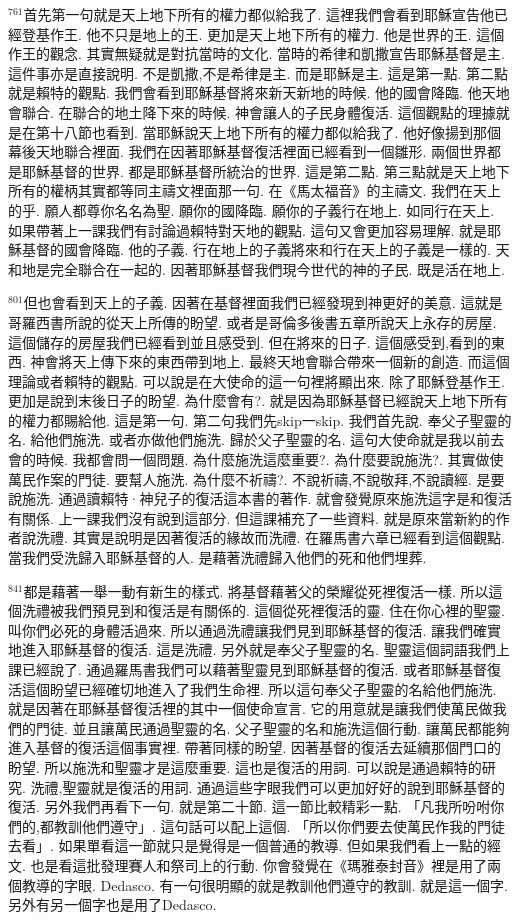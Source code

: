 \documentclass{book}
\begin{document}
$^{761}$首先第一句就是天上地下所有的權力都似給我了.
這裡我們會看到耶穌宣告他已經登基作王.
他不只是地上的王.
更加是天上地下所有的權力.
他是世界的王.
這個作王的觀念.
其實無疑就是對抗當時的文化.
當時的希律和凱撒宣告耶穌基督是主.
這件事亦是直接說明.
不是凱撒,不是希律是主.
而是耶穌是主.
這是第一點.
第二點就是賴特的觀點.
我們會看到耶穌基督將來新天新地的時候.
他的國會降臨.
他天地會聯合.
在聯合的地土降下來的時候.
神會讓人的子民身體復活.
這個觀點的理據就是在第十八節也看到.
當耶穌說天上地下所有的權力都似給我了.
他好像揚到那個幕後天地聯合裡面.
我們在因著耶穌基督復活裡面已經看到一個雛形.
兩個世界都是耶穌基督的世界.
都是耶穌基督所統治的世界.
這是第二點.
第三點就是天上地下所有的權柄其實都等同主禱文裡面那一句.
在《馬太福音》的主禱文.
我們在天上的乎.
願人都尊你名名為聖.
願你的國降臨.
願你的子義行在地上.
如同行在天上.
如果帶著上一課我們有討論過賴特對天地的觀點.
這句又會更加容易理解.
就是耶穌基督的國會降臨.
他的子義.
行在地上的子義將來和行在天上的子義是一樣的.
天和地是完全聯合在一起的.
因著耶穌基督我們現今世代的神的子民.
既是活在地上.

$^{801}$但也會看到天上的子義.
因著在基督裡面我們已經發現到神更好的美意.
這就是哥羅西書所說的從天上所傳的盼望.
或者是哥倫多後書五章所說天上永存的房屋.
這個儲存的房屋我們已經看到並且感受到.
但在將來的日子.
這個感受到,看到的東西.
神會將天上傳下來的東西帶到地上.
最終天地會聯合帶來一個新的創造.
而這個理論或者賴特的觀點.
可以說是在大使命的這一句裡將顯出來.
除了耶穌登基作王.
更加是說到末後日子的盼望.
為什麼會有?.
就是因為耶穌基督已經說天上地下所有的權力都賜給他.
這是第一句.
第二句我們先skip一skip.
我們首先說.
奉父子聖靈的名.
給他們施洗.
或者亦做他們施洗.
歸於父子聖靈的名.
這句大使命就是我以前去會的時候.
我都會問一個問題.
為什麼施洗這麼重要?.
為什麼要說施洗?.
其實做使萬民作案的門徒.
要幫人施洗.
為什麼不祈禱?.
不說祈禱,不說敬拜,不說讀經.
是要說施洗.
通過讀賴特·神兒子的復活這本書的著作.
就會發覺原來施洗這字是和復活有關係.
上一課我們沒有說到這部分.
但這課補充了一些資料.
就是原來當新約的作者說洗禮.
其實是說明是因著復活的緣故而洗禮.
在羅馬書六章已經看到這個觀點.
當我們受洗歸入耶穌基督的人.
是藉著洗禮歸入他們的死和他們埋葬.

$^{841}$都是藉著一舉一動有新生的樣式.
將基督藉著父的榮耀從死裡復活一樣.
所以這個洗禮被我們預見到和復活是有關係的.
這個從死裡復活的靈.
住在你心裡的聖靈.
叫你們必死的身體活過來.
所以通過洗禮讓我們見到耶穌基督的復活.
讓我們確實地進入耶穌基督的復活.
這是洗禮.
另外就是奉父子聖靈的名.
聖靈這個詞語我們上課已經說了.
通過羅馬書我們可以藉著聖靈見到耶穌基督的復活.
或者耶穌基督復活這個盼望已經確切地進入了我們生命裡.
所以這句奉父子聖靈的名給他們施洗.
就是因著在耶穌基督復活裡的其中一個使命宣言.
它的用意就是讓我們使萬民做我們的門徒.
並且讓萬民通過聖靈的名.
父子聖靈的名和施洗這個行動.
讓萬民都能夠進入基督的復活這個事實裡.
帶著同樣的盼望.
因著基督的復活去延續那個門口的盼望.
所以施洗和聖靈才是這麼重要.
這也是復活的用詞.
可以說是通過賴特的研究.
洗禮,聖靈就是復活的用詞.
通過這些字眼我們可以更加好好的說到耶穌基督的復活.
另外我們再看下一句.
就是第二十節.
這一節比較精彩一點.
「凡我所吩咐你們的,都教訓他們遵守」.
這句話可以配上這個.
「所以你們要去使萬民作我的門徒去看」.
如果單看這一節就只是覺得是一個普通的教導.
但如果我們看上一點的經文.
也是看這批發理賽人和祭司上的行動.
你會發覺在《瑪雅泰封音》裡是用了兩個教導的字眼.
Dedasco.
有一句很明顯的就是教訓他們遵守的教訓.
就是這一個字.
另外有另一個字也是用了Dedasco.
\end{document}
